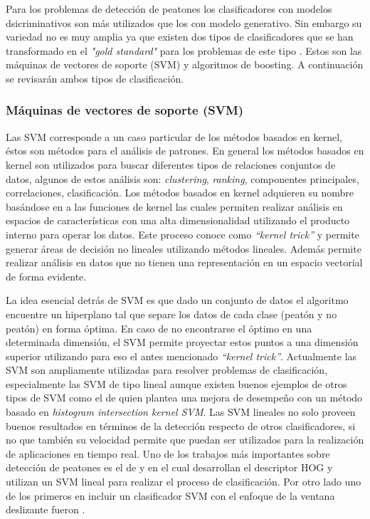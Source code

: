 Para los problemas de detección de peatones los clasificadores con modelos dsicriminativos son más utilizados que los con modelo generativo. Sin embargo su variedad no es muy amplia ya que existen dos tipos de clasificadores que se han transformado en el \textit{"gold standard"} para los problemas de este tipo \cite{dollar2012}. Estos son las máquinas de vectores de soporte (SVM) y algoritmos de boosting. A continuación se revisarán ambos tipos de clasificación.

\subsubsection{Máquinas de vectores de soporte (SVM)}

Las SVM corresponde a un caso particular de los métodos basados en kernel, éstos son métodos para el análisis de patrones. En general los métodos basados en kernel son utilizados para buscar diferentes tipos de relaciones conjuntos de datos, algunos de estos análisis son: \textit{clustering}, \textit{ranking}, componentes principales, correlaciones, clasificación. Los métodos basados en kernel adquieren su nombre basándose en a las funciones de kernel las cuales permiten realizar análisis en espacios de características con una alta dimensionalidad utilizando el producto interno para operar los datos. Este proceso  conoce como \textit{``kernel trick''} y permite generar áreas de decisión no lineales utilizando métodos lineales. Además permite realizar análisis en datos que no tienen una representación en un espacio vectorial de forma evidente.

La idea esencial detrás de SVM es que dado un conjunto de datos el algoritmo encuentre un hiperplano tal que separe los datos de cada clase (peatón y no peatón) en forma óptima. En caso de no encontrarse el óptimo en una determinada dimensión, el SVM permite proyectar estos puntos a una dimensión superior utilizando para eso el antes mencionado \textit{``kernel trick''}. Actualmente las SVM son ampliamente utilizadas para resolver problemas de clasificación, especialmente las SVM de tipo lineal aunque existen buenos ejemplos de otros tipos de SVM como el de \cite{Maji2008} quien plantea una mejora de desempeño con un método basado en \textit{histogram intersection kernel SVM}.
Las SVM lineales no solo proveen buenos resultados en términos de la detección respecto de otros clasificadores, si no que también su velocidad permite que puedan ser utilizados para la realización de aplicaciones en tiempo real. Uno de los trabajos más importantes sobre detección de peatones es el de \cite{dalal2005} y \cite{dalal2006} en el cual desarrollan el descriptor HOG y utilizan un SVM lineal para realizar el proceso de clasificación. Por otro lado uno de los primeros en incluir un clasificador SVM con el enfoque de la ventana deslizante fueron \cite{Papageorgiou2000}. 

